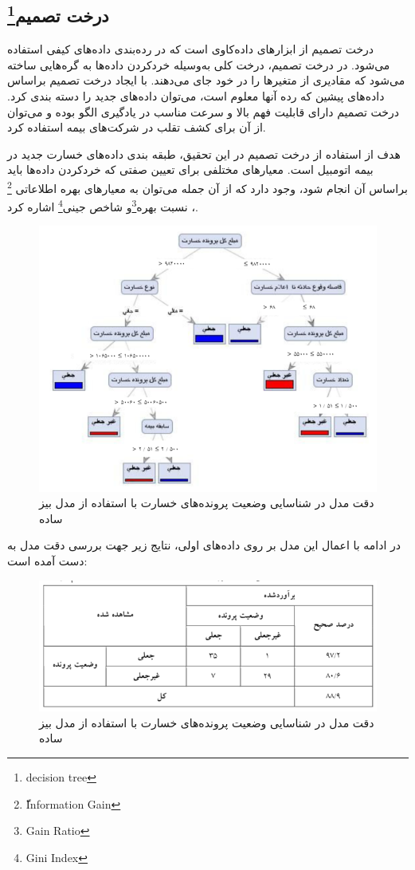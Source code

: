 \documentclass[paper=a4, fontsize=11pt]{article}
\numberwithin{equation}{section} %
\numberwithin{figure}{section} %
\numberwithin{table}{section} %
\begin{document}
\subsection{درخت تصمیم\protect\footnote{decision tree}}
\par
درخت تصمیم از ابزار‌‌های داده‌کاوی است که در رده‌بندی داده‌های کیفی استفاده می‌شود. در درخت تصمیم، درخت کلی به‌وسیله خردکردن داده‌ها به گره‌هایی ساخته می‌شود که مقادیری از متغیر‌ها را در خود جای می‌دهند. با ایجاد درخت تصمیم براساس داده‌های پیشین که رده آنها معلوم است، می‌توان داده‌های جدید را دسته بندی کرد. درخت تصمیم دارای قابلیت فهم بالا و سرعت مناسب در یادگیری الگو بوده و می‌توان از آن برای کشف تقلب در شرکت‌های بیمه استفاده کرد.
\par
هدف از استفاده از درخت تصمیم در این تحقیق، طبقه بندی داده‌های خسارت جدید در بیمه اتومبیل است. معیار‌های مختلفی برای تعیین صفتی که خردکردن داده‌ها باید براساس آن انجام شود، وجود دارد که از آن جمله می‌توان به معیار‌های بهره اطلاعاتی \footnote{ّInformation Gain}
، نسبت بهره\footnote{Gain Ratio}و شاخص جینی\footnote{Gini Index} اشاره کرد.
\begin{figure}[h]
    \centering
    \includegraphics[scale=0.7]{dt}
    \caption{دقت مدل در شناسایی وضعیت پرونده‌های خسارت با استفاده از مدل بیز ساده}
    \label{fig:dt}
\end{figure}
\par
در ادامه با اعمال این مدل بر روی داده‌های اولی، نتایج زیر جهت بررسی دقت مدل به دست آمده است:
\begin{figure}[h]
    \centering
    \includegraphics[scale=0.7]{table-dt}
    \caption{دقت مدل در شناسایی وضعیت پرونده‌های خسارت با استفاده از مدل بیز ساده}
    \label{fig:table-dt}
\end{figure}
\end{document}

